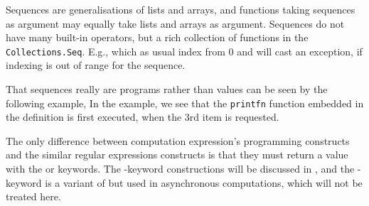 \documentclass[fsharpnotes.tex]{subfiles}
\begin{document}
Sequences are generalisations of lists and arrays, and functions taking sequences as argument may equally take lists and arrays as argument. Sequences do not have many built-in operators, but a rich collection of functions in the \lstinline!Collections.Seq!. E.g.,
%
%
which as usual index from 0 and will cast an exception, if indexing is out of range for the sequence. 

That sequences really are programs rather than values can be seen by the following example,
%
%
In the example, we see that the \lstinline!printfn! function embedded in the definition is first executed, when the 3rd item is requested.


The only difference between computation expression's programming constructs and the similar regular expressions constructs is that they must return a value with the  or  keywords. The -keyword constructions will be discussed in , and the -keyword is a variant of  but used in asynchronous computations, which will not be treated here.

\end{document}
